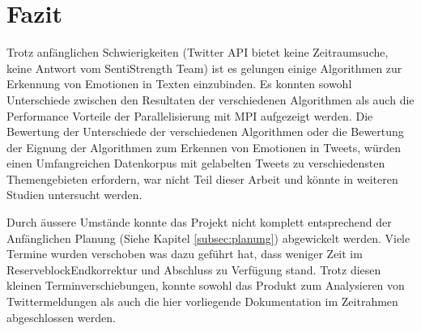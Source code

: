 \clearpage
\section{Fazit}
Trotz anfänglichen Schwierigkeiten (Twitter API bietet keine Zeitraumsuche, keine Antwort vom SentiStrength Team) ist es gelungen einige Algorithmen zur Erkennung von Emotionen in Texten einzubinden. Es konnten sowohl Unterschiede zwischen den Resultaten der verschiedenen Algorithmen als auch die Performance Vorteile der Parallelisierung mit MPI aufgezeigt werden. Die Bewertung der Unterschiede der verschiedenen Algorithmen oder die Bewertung der Eignung der Algorithmen zum Erkennen von Emotionen in Tweets, würden einen Umfangreichen Datenkorpus mit gelabelten Tweets zu verschiedensten Themengebieten erfordern, war nicht Teil dieser Arbeit und könnte in weiteren Studien untersucht werden.

Durch äussere Umstände konnte das Projekt nicht komplett entsprechend der Anfänglichen Planung (Siehe Kapitel \ref{subsec:planung}) abgewickelt werden. Viele Termine wurden verschoben was dazu geführt hat, dass weniger Zeit im \flqq Reserveblock\frqq Endkorrektur und Abschluss zu Verfügung stand. Trotz diesen kleinen Terminverschiebungen, konnte sowohl das Produkt zum Analysieren von Twittermeldungen als auch die hier vorliegende Dokumentation im Zeitrahmen abgeschlossen werden. 